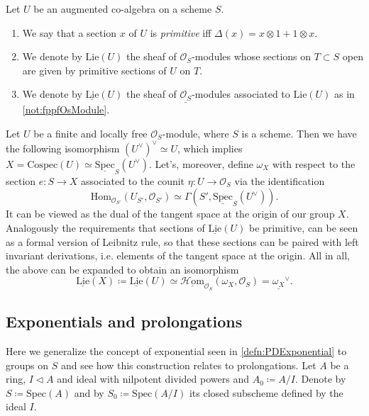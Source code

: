 \begin{defn}[]
	Let $U$ be an augmented co-algebra on a scheme $S$.
\begin{enumerate}
\item We say that a section $x$ of $U$ is {\em primitive} iff
	$\Delta(x) = x \otimes 1 + 1 \otimes x$.

\item We denote by $\mathrm{Lie}(U)$ the sheaf of $\mathcal{O}_{ S }$-modules
	whose sections on $T \subset S$ open are given by
	primitive sections of $U$ on $T$.

\item We denote by $\underline{\mathrm{Lie}}(U)$ the sheaf of $\underline{\mathcal{O}_{ S }}$-modules
	associated to $\mathrm{Lie}(U)$ as in \cref{not:fppfOsModule}.
\end{enumerate}
\end{defn}


\begin{rem}\label{LieDualConormalSheaf}
	Let $U$ be a finite and locally free $\mathcal{O}_{ S }$-module,
	where $S$ is a scheme.
	Then we have the following isomorphism $(U^\vee)^\vee \simeq U$,
	which implies $X = \mathrm{Cospec}(U) \simeq 
	\underline{\mathrm{Spec}}_S(U^\vee)$.
	Let's, moreover, define $\omega_X$ with respect to the section $e\colon S \to X$
	associated to the counit $\eta\colon U \to \mathcal{O}_{ S }$
	via the identification
	\begin{equation*}
		\mathrm{Hom}_{ \mathcal{O}_{ S' }}
		\left( U_{S'}, \mathcal{O}_{ S' } \right) 
		\simeq
		\Gamma(S', \underline{\mathrm{Spec}}_S(U^\vee))
	.\end{equation*}
	It can be viewed as the dual of the tangent space at the origin
	of our group $X$.
	Analogously the requirements that sections of $\underline{\mathrm{Lie}}(U)$
	be primitive, can be seen as a formal version of Leibnitz rule,
	so that these sections can be paired with left invariant derivations, i.e$.$
	elements of the tangent space at the origin.
	All in all, the above can be expanded to obtain an isomorphism
	\begin{equation*}
		\underline{\mathrm{Lie}}(X) \coloneqq
		\underline{\mathrm{Lie}}(U) \simeq
		\underline{\mathcal{H}\mathrm{om}}_{ \mathcal{O}_{ S } } 
		\left(\omega_X , \mathcal{O}_{ S } \right) =
		\underline{\omega_X}^\vee
	.\end{equation*}
\end{rem}


\subsection{Exponentials and prolongations}
Here we generalize the concept of exponential seen in \cref{defn:PDExponential}
to groups on $S$ and see how this construction relates to prolongations.
Let $A$ be a ring, $I \triangleleft A$ and ideal with nilpotent
divided powers and $A_0 \coloneqq A/I$.
Denote by $S \coloneqq \mathrm{Spec}(A)$
and by $S_0 \coloneqq \mathrm{Spec}(A/I)$ its closed
subscheme defined by the ideal $I$.



